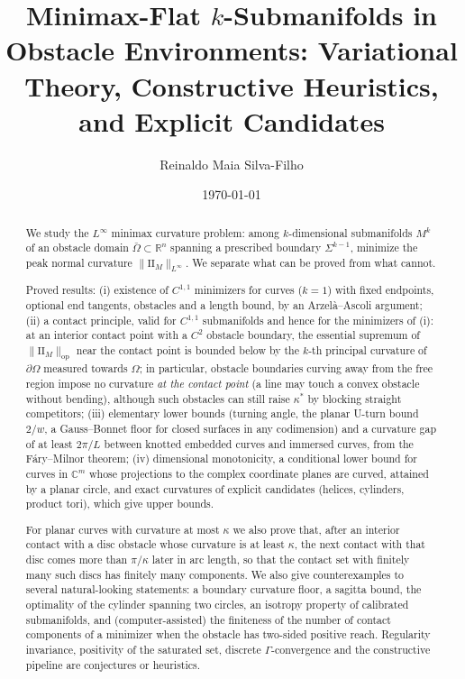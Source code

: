 \documentclass[11pt,reqno]{amsart}
\theoremstyle{definition}
\providecommand{\R}{\mathbb{R}}
\newcommand{\C}{\mathbb{C}}
\providecommand{\II}{\mathrm{I\!I}}
\newcommand{\op}{\mathrm{op}}
\numberwithin{equation}{section}
\providecommand{\II}{\mathrm{II}}
\providecommand{\R}{\mathbb{R}}
\begin{document}
\title[Minimax-Flat \texorpdfstring{$k$}{k}-Submanifolds in Obstacle Environments]{Minimax-Flat \texorpdfstring{$k$}{k}-Submanifolds in Obstacle Environments: Variational Theory, Constructive Heuristics, and Explicit Candidates}

\author{Reinaldo Maia Silva-Filho}
\address{Programa de P\'os-Gradua\c{c}\~ao em Estat\'istica e Experimenta\c{c}\~ao Agropecu\'aria (PPGEE/DES), Universidade Federal de Lavras (UFLA)}

\date{\today}

\begin{abstract}
We study the $L^\infty$ minimax curvature problem: among $k$-dimensional submanifolds $M^k$ of an obstacle domain $\bar{\Omega} \subset \R^n$ spanning a prescribed boundary $\Sigma^{k-1}$, minimize the peak normal curvature $\|\II_M\|_{L^\infty}$. We separate what can be proved from what cannot.

Proved results: (i) existence of $C^{1,1}$ minimizers for curves ($k=1$) with fixed endpoints, optional end tangents, obstacles and a length bound, by an Arzel\`a--Ascoli argument; (ii) a contact principle, valid for $C^{1,1}$ submanifolds and hence for the minimizers of (i): at an interior contact point with a $C^2$ obstacle boundary, the essential supremum of $\|\II_M\|_{\op}$ near the contact point is bounded below by the $k$-th principal curvature of $\partial\Omega$ measured towards $\Omega$; in particular, obstacle boundaries curving away from the free region impose no curvature \emph{at the contact point} (a line may touch a convex obstacle without bending), although such obstacles can still raise $\kappa^*$ by blocking straight competitors; (iii) elementary lower bounds (turning angle, the planar U-turn bound $2/w$, a Gauss--Bonnet floor for closed surfaces in any codimension) and a curvature gap of at least $2\pi/L$ between knotted embedded curves and immersed curves, from the F\'ary--Milnor theorem; (iv) dimensional monotonicity, a conditional lower bound for curves in $\C^m$ whose projections to the complex coordinate planes are curved, attained by a planar circle, and exact curvatures of explicit candidates (helices, cylinders, product tori), which give upper bounds.

For planar curves with curvature at most $\kappa$ we also prove that, after an interior contact with a disc obstacle whose curvature is at least $\kappa$, the next contact with that disc comes more than $\pi/\kappa$ later in arc length, so that the contact set with finitely many such discs has finitely many components. We also give counterexamples to several natural-looking statements: a boundary curvature floor, a sagitta bound, the optimality of the cylinder spanning two circles, an isotropy property of calibrated submanifolds, and (computer-assisted) the finiteness of the number of contact components of a minimizer when the obstacle has two-sided positive reach. Regularity invariance, positivity of the saturated set, discrete $\Gamma$-convergence and the constructive pipeline are conjectures or heuristics.
\end{abstract}
\end{document}

